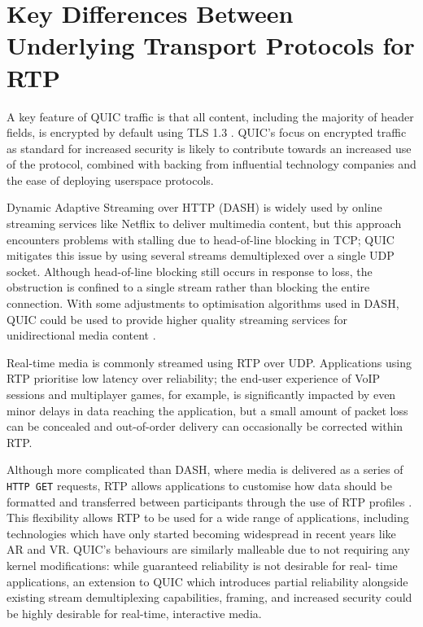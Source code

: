 \documentclass{mprop}
\begin{document}
\section{Key Differences Between Underlying Transport Protocols for RTP}

A key feature of QUIC traffic is that all content, including the majority of header fields, is 
encrypted by default using TLS 1.3 \cite{quic-transport-16}. QUIC's focus on encrypted traffic as 
standard for increased security is likely to contribute towards an increased use of the protocol, 
combined with backing from influential technology companies and the ease of deploying userspace 
protocols.

Dynamic Adaptive Streaming over HTTP (DASH) is widely used by online streaming services like 
Netflix to deliver multimedia content, but this approach encounters problems with stalling due to 
head-of-line blocking in TCP; QUIC mitigates this issue by using several streams demultiplexed 
over a single UDP socket. Although head-of-line blocking still occurs in response to loss, the 
obstruction is confined to a single stream rather than blocking the entire connection. With some 
adjustments to optimisation algorithms used in DASH, QUIC could be used to provide higher quality 
streaming services for unidirectional media content \cite{Bhat2017}.

Real-time media is commonly streamed using RTP over UDP. Applications using RTP prioritise low 
latency over reliability; the end-user experience of VoIP sessions and multiplayer games, for 
example, is significantly impacted by even minor delays in data reaching the application, but a 
small amount of packet loss can be concealed and out-of-order delivery can occasionally be 
corrected within RTP.

Although more complicated than DASH, where media is delivered as a series of \texttt{HTTP GET} 
requests, RTP allows applications to customise how data should be formatted and transferred 
between participants through the use of RTP profiles \cite{RTP-RFC}. This flexibility allows RTP 
to be used for a wide range of applications, including technologies which have only started 
becoming widespread in recent years like AR and VR. QUIC's behaviours are similarly malleable due 
to not requiring any kernel modifications: while guaranteed reliability is not desirable for real-
time applications, an extension to QUIC which introduces partial reliability alongside existing 
stream demultiplexing capabilities, framing, and increased security could be highly desirable for 
real-time, interactive media.
\end{document}
